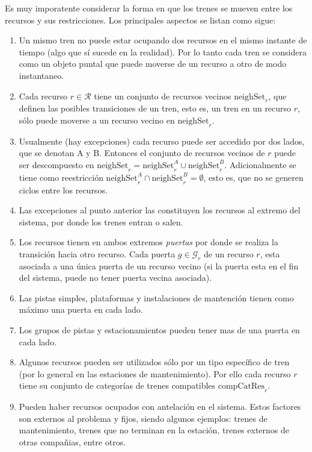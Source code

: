 \documentclass[letter, 10pt]{article}
\begin{document}
\begin{description}
	Es muy imporatente considerar la forma en que los trenes se mueven entre los recursos y sus restricciones. Los principales aspectos se listan como sigue:
	\begin{enumerate}
		\item Un mismo tren no puede estar ocupando dos recursos en el mismo instante de tiempo (algo que sí sucede en la realidad). Por lo tanto cada tren se considera como un objeto puntal que puede moverse de un recurso a otro de modo instantaneo.
		\item Cada recurso $r \in \mathcal{R}$ tiene un conjunto de recursos vecinos $\text{neighSet}_r$, que definen las posibles transiciones de un tren, esto es, un tren en un recurso $r$, sólo puede moverse a un recurso vecino en $\text{neighSet}_r$.
		\item Usualmente (hay excepciones) cada recurso puede ser accedido por dos lados, que se denotan A y B. Entonces el conjunto de recursos vecinos de $r$ puede ser descompuesto en $\text{neighSet}_r = \text{neighSet}_r^A \cup \text{neighSet}_r^B$. Adicionalmente se tiene como reestricción $\text{neighSet}_r^A \cap \text{neighSet}_r^B = \emptyset$, esto es, que no se generen ciclos entre los recursos.
		\item Las excepciones al punto anterior las constituyen los recursos al extremo del sistema, por donde los trenes entran o salen.
		\item Los recursos tienen en ambos extremos \textit{puertas} por donde se realiza la transición hacia otro recurso.
		Cada puerta $g \in \mathcal{G}_r$ de un recurso $r$, esta asociada a una única puerta de un recurso vecino (si la puerta esta en el fin del sistema, puede no tener puerta vecina asociada).
		\item Las pistas simples, plataformas y instalaciones de mantención tienen como máximo una puerta en cada lado.
		\item Los grupos de pistas y estacionamientos pueden tener mas de una puerta en cada lado. 
		\item Algunos recursos pueden ser utilizados sólo por un tipo específico de tren (por lo general en las estaciones de mantenimiento). Por ello cada recurso $r$ tiene su conjunto de categorías de trenes compatibles $\text{compCatRes}_r$.
		\item Pueden haber recursos ocupados con antelación en el sistema. Estos factores son externos al problema y fijos, siendo algunos ejemplos: trenes de mantenimiento, trenes que no terminan en la estación, trenes externos de otras compañias, entre otros. 
	\end{enumerate}


\end{description}
\end{document}

